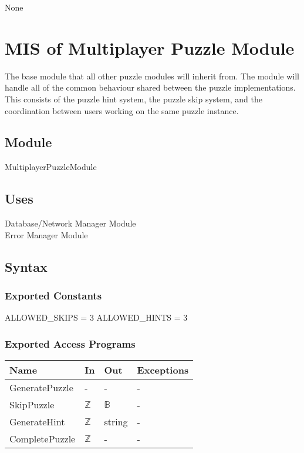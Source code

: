 \documentclass[12pt, titlepage]{article}
\begin{document}
None

\newpage

\section{MIS of {Multiplayer Puzzle Module}} \label{DocModule} 

The base module that all other puzzle modules will inherit from. The module will handle all of the common behaviour shared between the puzzle implementations. This consists of the puzzle hint system, the puzzle skip system, and the coordination between users working on the same puzzle instance. 

\subsection{Module}
MultiplayerPuzzleModule

\subsection{Uses}
Database/Network Manager Module\\
Error Manager Module

\subsection{Syntax}

\subsubsection{Exported Constants}
ALLOWED\_SKIPS = 3 \newline
\noindent ALLOWED\_HINTS = 3

\subsubsection{Exported Access Programs}

\begin{center}
\begin{tabular}{p{4cm} p{3cm} p{3cm} p{3cm}}
\hline
\textbf{Name} & \textbf{In} & \textbf{Out} & \textbf{Exceptions} \\
\hline
GeneratePuzzle & - & - & - \\
SkipPuzzle & $\mathds{Z}$ & $\mathds{B}$ & - \\
GenerateHint & $\mathds{Z}$ & string & - \\
CompletePuzzle & $\mathds{Z}$ & - & - \\
\hline
\end{tabular}
\end{center}
\end{document}
